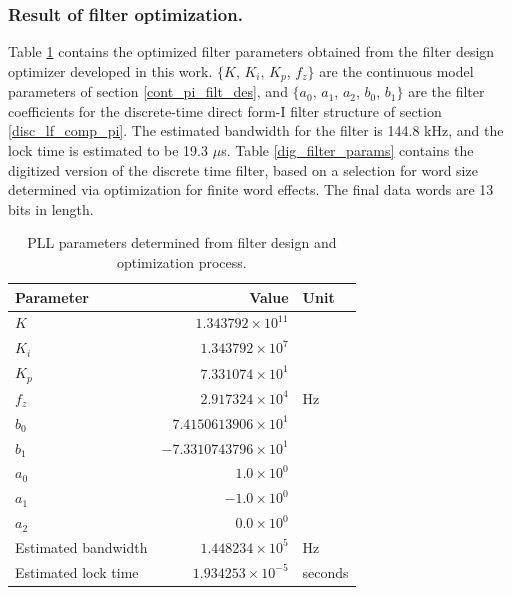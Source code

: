 \subsubsection{Result of filter optimization.}
Table \ref{filter_params} contains the optimized filter parameters obtained from the filter design optimizer developed in this work. $\{K$, $K_i$, $K_p$, $f_z\}$ are the continuous model parameters of section \ref{cont_pi_filt_des}, and $\{a_0$, $a_1$, $a_2$, $b_0$, $b_1\}$ are the filter coefficients for the discrete-time direct form-I filter structure of section \ref{disc_lf_comp_pi}. The estimated bandwidth for the filter is 144.8 kHz, and the lock time is estimated to be 19.3 $\mu$s. Table \ref{dig_filter_params} contains the digitized version of the discrete time filter, based on a selection for word size determined via optimization for finite word effects. The final data words are 13 bits in length.  
\begin{table}[h!]
	\centering
	\def\arraystretch{1.5}		
	\setlength\arrayrulewidth{0.75pt}
	\setlength{\tabcolsep}{1em} %
	\begin{tabular}{|l|r|l|}
		\hline 
		\rule[-1ex]{0pt}{2.5ex} \cellcolor{gray!40}\textbf{Parameter} & \cellcolor{gray!40}\textbf{Value} & \cellcolor{gray!40}\textbf{Unit }\\ 
		\hline 
		\rule[-1ex]{0pt}{2.5ex} \textbf{$K$}  & $1.343792\times10^{11}$ &  \\ 
		\hline 
		\rule[-1ex]{0pt}{2.5ex} \textbf{$K_i$}  & $1.343792\times10^{7}$ &  \\ 
		\hline 
		\rule[-1ex]{0pt}{2.5ex} \textbf{$K_p$}  & $7.331074\times10^{1}$ &  \\ 
		\hline 
		\rule[-1ex]{0pt}{2.5ex} \textbf{$f_z$} & $2.917324\times10^4$ & Hz\\ 
		\hline 
		\rule[-1ex]{0pt}{2.5ex} \textbf{$b_0$}  & $7.4150613906\times10^1$  &\\ 
		\hline 
		\rule[-1ex]{0pt}{2.5ex} \textbf{$b_1$}  & $-7.3310743796\times10^1$  & \\ 
		\hline 
		\rule[-1ex]{0pt}{2.5ex} \textbf{$a_0$}  & $1.0\times10^0$  &\\ 
		\hline 
		\rule[-1ex]{0pt}{2.5ex} \textbf{$a_1$}  & $-1.0\times10^0$  & \\ 
		\hline 
		\rule[-1ex]{0pt}{2.5ex} \textbf{$a_2$}  & $0.0\times10^0$  & \\ 
		\hline 
		\rule[-1ex]{0pt}{2.5ex} Estimated bandwidth & $1.448234\times10^5$ & Hz \\ 
		\hline 
		\rule[-1ex]{0pt}{2.5ex} Estimated lock time & $1.934253\times10^{-5}$ & seconds \\ 
		\hline 
	\end{tabular} 
	\caption{PLL parameters determined from filter design and optimization process.}
	\label{filter_params}
\end{table}   

